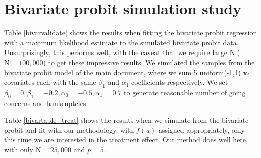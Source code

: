 \documentclass[aoas,preprint, 11pt, dvipsnames, table, x11name]{imsart}
\newcommand{\N}{\mbox{N}}
\renewcommand{\bm}[1]{\mathbf{#1}}
\theoremstyle{remark}
\begin{document}
\section{Bivariate probit simulation study}\label{bivar_append}
Table \ref{bivarvalidate} shows the results when fitting the bivariate probit regression with a maximum likelihood estimate to the simulated bivariate probit data.  Unsurprisingly, this performs well, with the caveat that we require large $\N$ ($\N=100,000$) to get these impressive results.  We simulated the samples from the bivariate probit model of the main document, where we sum 5 uniform(-1,1) $\bm{x}_i$ covariates each with the same $\beta_1$ and $\alpha_1$ coefficients respectively.  We set $\beta_0=0, \beta_1=-0.2, \alpha_0=-0.5, \alpha_1=0.7$ to generate reasonable number of going concerns and bankruptcies.

Table \ref{bivartable_treat} shows the results when we simulate from the bivariate probit and fit with our methodology, with $f(u)$ assigned appropriately, only this time we are interested in the treatment effect.  Our method does well here, with only $\N=25,000$ and $p=5$.  
\end{document}
